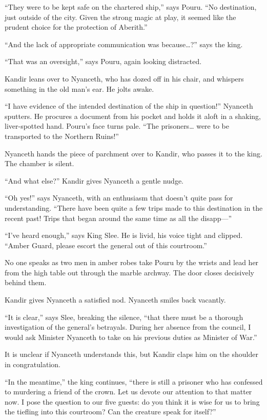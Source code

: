 \documentclass[smalldemyvopaper,11pt,twoside,onecolumn,openright,extrafontsizes]{memoir}
\begin{document}
``They were to be kept safe on the chartered ship,'' says Pouru. ``No
destination, just outside of the city. Given the strong magic at play,
it seemed like the prudent choice for the protection of Aberith.''

``And the lack of appropriate communication was because\ldots?'' says
the king.

``That was an oversight,'' says Pouru, again looking distracted.

Kandir leans over to Nyanceth, who has dozed off in his chair, and
whispers something in the old man's ear. He jolts awake.

``I have evidence of the intended destination of the ship in question!''
Nyanceth sputters. He procures a document from his pocket and holds it
aloft in a shaking, liver-spotted hand. Pouru's face turns pale. ``The
prisoners\ldots{} were to be transported to the Northern Ruins!''

Nyanceth hands the piece of parchment over to Kandir, who passes it to
the king. The chamber is silent.

``And what else?'' Kandir gives Nyanceth a gentle nudge.

``Oh yes!'' says Nyanceth, with an enthusiasm that doesn't quite pass
for understanding. ``There have been quite a few trips made to this
destination in the recent past! Trips that began around the same time as
all the disapp---''

``I've heard enough,'' says King Slee. He is livid, his voice tight and
clipped. ``Amber Guard, please escort the general out of this
courtroom.''

No one speaks as two men in amber robes take Pouru by the wrists and
lead her from the high table out through the marble archway. The door
closes decisively behind them.

Kandir gives Nyanceth a satisfied nod. Nyanceth smiles back vacantly.

``It is clear,'' says Slee, breaking the silence, ``that there must be a
thorough investigation of the general's betrayals. During her absence
from the council, I would ask Minister Nyanceth to take on his previous
duties as Minister of War.''

It is unclear if Nyanceth understands this, but Kandir claps him on the
shoulder in congratulation.

``In the meantime,'' the king continues, ``there is still a prisoner who
has confessed to murdering a friend of the crown. Let us devote our
attention to that matter now. I pose the question to our five guests: do
you think it is wise for us to bring the tiefling into this courtroom?
Can the creature speak for itself?''
\end{document}
